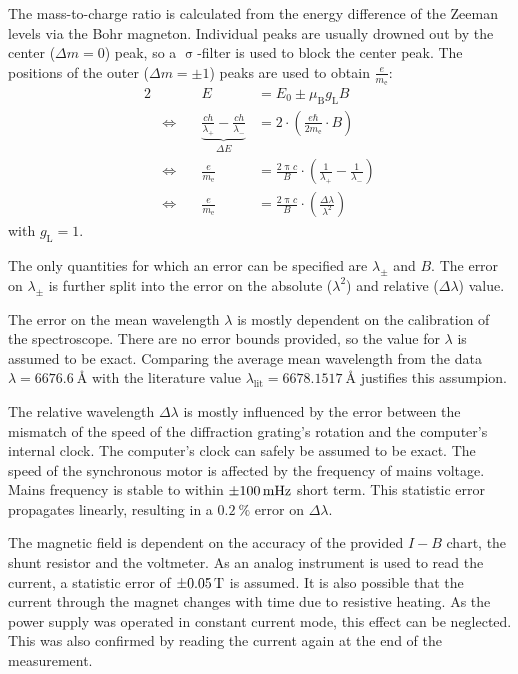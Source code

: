 The mass-to-charge ratio is calculated from the energy difference of the Zeeman levels via the Bohr magneton.
Individual peaks are usually drowned out by the center ($\Delta m = 0$) peak, so a $\upsigma$-filter is used to block the center peak.
The positions of the outer ($\Delta m = \pm 1$) peaks are used to obtain $\frac{e}{m_\text{e}}$:
\begin{alignat}{2}
	& &E &= E_0 \pm \mu_\text{B} g_\text{L} B\\
	&\Leftrightarrow \quad &\underbrace{\frac{c h}{\lambda_+} - \frac{c h}{\lambda_-}}_{\Delta E} &=
	2 \cdot \left(\frac{e \hbar}{2 m_\text{e}} \cdot B \right)\\
	&\Leftrightarrow &\frac{e}{m_\text{e}} &= \frac{2 \uppi c}{B} \cdot \left(\frac{1}{\lambda_+} - \frac{1}{\lambda_-}\right)\\
	&\Leftrightarrow &\frac{e}{m_\text{e}} &= \frac{2 \uppi c}{B} \cdot \left(\frac{\Delta \lambda}{\lambda^2}\right)
\end{alignat}
with $g_\text{L} = 1$.

The only quantities for which an error can be specified are $\lambda_\pm$ and $B$.
The error on $\lambda_\pm$ is further split into the error on the absolute ($\lambda^2$) and relative ($\Delta \lambda$) value.

The error on the mean wavelength $\lambda$ is mostly dependent on the calibration of the spectroscope.
There are no error bounds provided, so the value for $\lambda$ is assumed to be exact. 
Comparing the average mean wavelength from the data $\lambda = \SI{6676.6}{\angstrom}$ with the literature value $\lambda_\text{lit} = \SI{6678.1517}{\angstrom}$ justifies this assumpion.

The relative wavelength $\Delta \lambda$ is mostly influenced by the error between the mismatch of the speed of the diffraction grating's rotation and the computer's internal clock.
The computer's clock can safely be assumed to be exact.
The speed of the synchronous motor is affected by the frequency of mains voltage.
Mains frequency is stable to within $\SI{\pm 100}{\milli\hertz}$ short term.
This statistic error propagates linearly, resulting in a $\SI{0.2}{\percent}$ error on $\Delta\lambda$.

The magnetic field is dependent on the accuracy of the provided $I-B$ chart, the shunt resistor and the voltmeter.
As an analog instrument is used to read the current, a statistic error of $\SI{\pm 0.05}{\tesla}$ is assumed.
It is also possible that the current through the magnet changes with time due to resistive heating.
As the power supply was operated in constant current mode, this effect can be neglected.
This was also confirmed by reading the current again at the end of the measurement.

